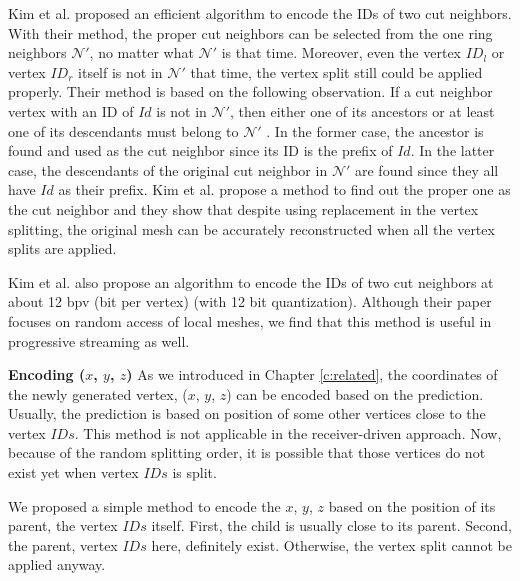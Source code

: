     
    Kim et al. \cite{multiresolution:kim} proposed an efficient algorithm to encode the IDs
    of two cut neighbors. With their method, the proper cut neighbors can be selected from
    the one ring neighbors $\mathcal{N}'$, no matter what $\mathcal{N}'$ is that time. 
    Moreover, even the vertex $ID_l$ or vertex $ID_r$ itself is not in $\mathcal{N'}$ that
    time, the vertex split still could be applied properly.
    Their method is based on the following observation.
    If a cut neighbor vertex with an ID of $Id$ %
    is not in $\mathcal{N}'$, then either one of its 
    ancestors or at least one of its descendants must belong to $\mathcal{N}'$ \cite{multiresolution:kim}.
    In the former case, the ancestor is found and used as 
    the cut neighbor since its ID is the prefix of $Id$.  
    In the latter case, the descendants of the original 
    cut neighbor in $\mathcal{N}'$ are found since they all have $Id$ as their prefix.
    Kim et al. \cite{multiresolution:kim} propose a method to find out the 
    proper one as the cut neighbor and they show that despite using replacement
    in the vertex splitting, the original mesh can be 
    accurately reconstructed when all the vertex splits are applied.

    Kim et al. \cite{multiresolution:kim} also propose an algorithm
    to encode the IDs of two cut neighbors at about 12 bpv (bit per vertex) 
    (with 12 bit quantization).
    Although their paper focuses on random access of local meshes, we find that this 
	method is useful in progressive streaming as well. 
    
    \textbf{Encoding ($x$, $y$, $z$)}
    As we introduced in Chapter \ref{c:related}, the coordinates of the newly generated
    vertex, ($x$, $y$, $z$) can be encoded based on the prediction. Usually, the prediction
    is based on position of some other vertices close to the vertex $IDs$. This method is 
    not applicable in the receiver-driven approach. Now, because of the random splitting order, 
    it is possible that those vertices do not exist yet when vertex $IDs$ is split. 
    
    We proposed a simple method to encode the $x$, $y$, $z$ based on the position
    of its parent, the vertex $IDs$ itself. First, the child is usually close to its
    parent. Second, the parent, vertex $IDs$ here, definitely exist. Otherwise, the vertex
    split cannot be applied anyway. 

